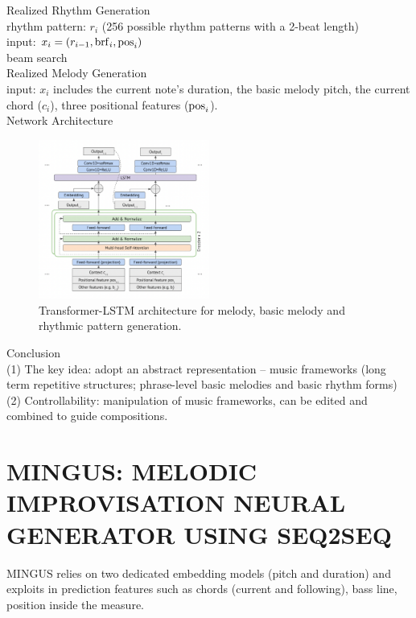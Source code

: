 \documentclass{article}
\begin{document}
\noindent
Realized Rhythm Generation\\
rhythm pattern: $r_i$ (256 possible rhythm patterns with a 2-beat length)\\
input: $x_i = (r_{i-1},{\rm brf}_i,{\rm pos}_i)$\\
beam search\\

\noindent
Realized Melody Generation\\
input: $x_i$ includes the current note's duration, the basic melody pitch, the current chord ($c_i$), three positional features (${\rm pos}_i$).\\

\noindent
Network Architecture
\begin{figure}[H]
	\centerline{
   \includegraphics[width=0.5\textwidth]{Fig6.png}}
   \caption{Transformer-LSTM architecture for melody, basic melody and rhythmic pattern generation.}
   \label{fig:example}
\end{figure}

\noindent
Conclusion\\
(1) The key idea: adopt an abstract representation -- music frameworks (long term repetitive structures; phrase-level basic melodies and basic rhythm forms)\\
(2) Controllability: manipulation of music frameworks, can be edited and combined to guide compositions.\\

\section{MINGUS: MELODIC IMPROVISATION NEURAL GENERATOR USING SEQ2SEQ}
MINGUS relies on two dedicated embedding models (pitch and duration) and exploits in prediction features such as chords (current and following), bass line, position inside the measure.\\
\end{document}
